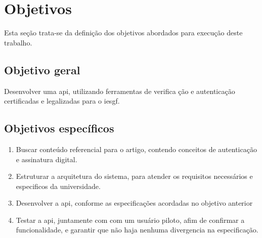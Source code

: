 \section{Objetivos}\label{sec:objetivos}

Esta seção trata-se da definição dos objetivos abordados para
execução deste trabalho.

\subsection{Objetivo geral}\label{subsec:objetivo-geral}

Desenvolver uma \acrfull{api}, utilizando ferramentas de verifica
ção e autenticação certificadas e legalizadas para o \acrfull{iesgf}.

\subsection{Objetivos específicos}\label{subsec:objetivos-especificos}

\newcommand{\buscaReferencia}{
    Buscar conteúdo referencial para o artigo, contendo conceitos
    de autenticação e assinatura digital.
}

\newcommand{\arquitetura}{
    Estruturar a arquitetura do sistema, para atender os requisitos
    necessários e especificos da universidade.
}

\newcommand{\implementacao}{
    Desenvolver a \acrshort{api}, conforme as especificações
    acordadas no objetivo anterior
}

\newcommand{\testes}{
    Testar a \acrshort{api}, juntamente com com um usuário piloto,
    afim de confirmar a funcionalidade, e garantir que não haja
    nenhuma divergencia na especificação.
}

\begin{enumerate}[label=\alph*)]
    \item  \buscaReferencia
    \item  \arquitetura
    \item  \implementacao
    \item  \testes
\end{enumerate}